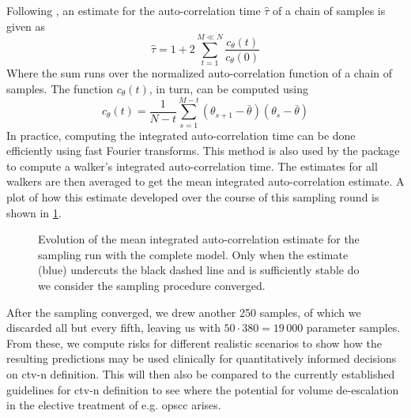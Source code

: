 \documentclass[\relativeRoot/main.tex]{subfiles}
\begin{document}
Following , an estimate for the auto-correlation time $\hat{\tau}$ of a chain of samples is given as
%
\begin{equation}
    \hat{\tau} = 1 + 2 \sum_{t=1}^{M \ll N}\frac{ c_\theta(t) }{ c_\theta(0) }
\end{equation}
%
Where the sum runs over the normalized auto-correlation function of a chain of samples. The function $c_\theta(t)$, in turn, can be computed using
%
\begin{equation}
    c_\theta(t) = \frac{1}{N-t} \sum_{s=1}^{M-t}{ \left( \theta_{s+1} - \bar{\theta} \right) \left( \theta_s - \bar{\theta} \right) }
\end{equation}
%
In practice, computing the integrated auto-correlation time can be done efficiently using fast Fourier transforms. This method is also used by the  package to compute a walker's integrated auto-correlation time. The estimates for all walkers are then averaged to get the mean integrated auto-correlation estimate. A plot of how this estimate developed over the course of this sampling round is shown in \cref{fig:complete:acor}.

\begin{figure}
    \centering
    \def\svgwidth{0.7\textwidth}
    
    \caption[
        Mean integrated auto-correlation estimate for the complete model's run
    ]{
        Evolution of the mean integrated auto-correlation estimate for the sampling run with the complete model. Only when the estimate (blue) undercuts the black dashed line and is sufficiently stable do we consider the sampling procedure converged.
    }
    \label{fig:complete:acor}
\end{figure}

After the sampling converged, we drew another 250 samples, of which we discarded all but every fifth, leaving us with $50 \cdot 380 = 19\,000$ parameter samples. From these, we compute risks for different realistic scenarios to show how the resulting predictions may be used clinically for quantitatively informed decisions on \gls{ctv-n} definition. This will then also be compared to the currently established guidelines for \gls{ctv-n} definition to see where the potential for volume de-escalation in the elective treatment of e.g. \gls{opscc} arises.









\end{document}

